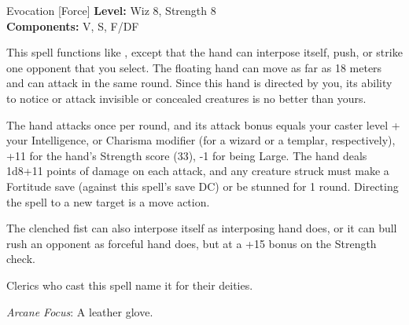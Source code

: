 {Evocation [Force]}
{
	\textbf{Level:}
	Wiz 8, Strength 8\\
	\textbf{Components:}
	V, S, F/DF\\
}
{
	This spell functions like , except that the hand can interpose itself, push, or strike one opponent that you select. The floating hand can move as far as 18 meters and can attack in the same round. Since this hand is directed by you, its ability to notice or attack invisible or concealed creatures is no better than yours.

	The hand attacks once per round, and its attack bonus equals your caster level + your Intelligence, or Charisma modifier (for a wizard or a templar, respectively), +11 for the hand's Strength score (33), -1 for being Large. The hand deals 1d8+11 points of damage on each attack, and any creature struck must make a Fortitude save (against this spell's save DC) or be stunned for 1 round. Directing the spell to a new target is a move action.

	The clenched fist can also interpose itself as interposing hand does, or it can bull rush an opponent as forceful hand does, but at a +15 bonus on the Strength check.

Clerics who cast this spell name it for their deities.

	\textit{Arcane Focus}:
	A leather glove.

}
